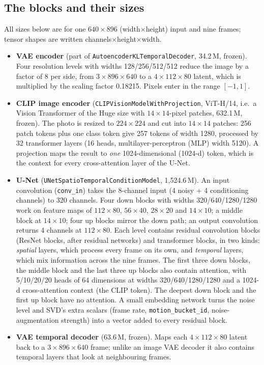 \documentclass[11pt]{article}
\begin{document}
\subsection{The blocks and their sizes}\label{sec:sizes}
All sizes below are for one $640\times896$ (width$\times$height) input and nine frames; tensor shapes are written channels$\times$height$\times$width.
\begin{itemize}[leftmargin=*,itemsep=2pt]
  \item \textbf{VAE encoder} (part of \texttt{AutoencoderKLTemporalDecoder}, 34.2\,M, frozen). Four resolution levels with widths 128/256/512/512 reduce the image by a factor of 8 per side, from $3\times896\times640$ to a $4\times112\times80$ latent, which is multiplied by the scaling factor 0.18215. Pixels enter in the range $[-1,1]$.
  \item \textbf{CLIP image encoder} (\texttt{CLIPVisionModelWithProjection}, ViT-H/14, i.e.\ a Vision Transformer of the Huge size with $14\times14$-pixel patches, 632.1\,M, frozen). The photo is resized to $224\times224$ and cut into $14\times14$ patches: 256 patch tokens plus one class token give 257 tokens of width 1280, processed by 32 transformer layers (16 heads, multilayer-perceptron (MLP) width 5120). A projection maps the result to \emph{one} 1024-dimensional (1024-d) token, which is the context for every cross-attention layer of the U-Net.
  \item \textbf{U-Net} (\texttt{UNetSpatioTemporalConditionModel}, 1{,}524.6\,M). An input convolution (\texttt{conv\_in}) takes the 8-channel input (4 noisy + 4 conditioning channels) to 320 channels. Four down blocks with widths 320/640/1280/1280 work on feature maps of $112\times80$, $56\times40$, $28\times20$ and $14\times10$; a middle block at $14\times10$; four up blocks mirror the down path; an output convolution returns 4 channels at $112\times80$. Each level contains residual convolution blocks (ResNet blocks, after residual networks) and transformer blocks, in two kinds: \emph{spatial} layers, which process every frame on its own, and \emph{temporal} layers, which mix information across the nine frames. The first three down blocks, the middle block and the last three up blocks also contain attention, with 5/10/20/20 heads of 64 dimensions at widths 320/640/1280/1280 and a 1024-d cross-attention context (the CLIP token). The deepest down block and the first up block have no attention. A small embedding network turns the noise level and SVD's extra scalars (frame rate, \texttt{motion\_bucket\_id}, noise-augmentation strength) into a vector added to every residual block.
  \item \textbf{VAE temporal decoder} (63.6\,M, frozen). Maps each $4\times112\times80$ latent back to a $3\times896\times640$ frame; unlike an image VAE decoder it also contains temporal layers that look at neighbouring frames.
\end{itemize}
\end{document}
